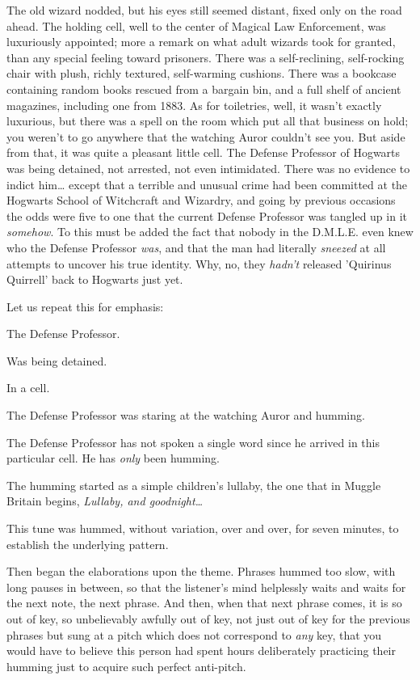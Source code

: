 The old wizard nodded, but his eyes still seemed distant, fixed only on the 
road ahead.
\sbreak
The holding cell, well to the center of Magical Law Enforcement, was 
luxuriously appointed; more a remark on what adult wizards took for granted, 
than any special feeling toward prisoners. There was a self-reclining, 
self-rocking chair with plush, richly textured, self-warming cushions. There 
was a bookcase containing random books rescued from a bargain bin, and a full 
shelf of ancient magazines, including one from 1883. As for toiletries, well, 
it wasn't exactly luxurious, but there was a spell on the room which put all 
that business on hold; you weren't to go anywhere that the watching Auror 
couldn't see you. But aside from that, it was quite a pleasant little cell. The 
Defense Professor of Hogwarts was being detained, not arrested, not even 
intimidated. There was no evidence to indict him{\ldots} except that a terrible 
and unusual crime had been committed at the Hogwarts School of Witchcraft and 
Wizardry, and going by previous occasions the odds were five to one that the 
current Defense Professor was tangled up in it \emph{somehow}. To this must be 
added the fact that nobody in the D.M.L.E. even knew who the Defense Professor 
\emph{was}, and that the man had literally \emph{sneezed} at all attempts to 
uncover his true identity. Why, no, they \emph{hadn't} released 'Quirinus 
Quirrell' back to Hogwarts just yet.

Let us repeat this for emphasis:

The Defense Professor.

Was being detained.

In a cell.

The Defense Professor was staring at the watching Auror and humming.

The Defense Professor has not spoken a single word since he arrived in this 
particular cell. He has \emph{only} been humming.

The humming started as a simple children's lullaby, the one that in Muggle 
Britain begins, \emph{Lullaby, and goodnight{\ldots}}

This tune was hummed, without variation, over and over, for seven minutes, to 
establish the underlying pattern.

Then began the elaborations upon the theme. Phrases hummed too slow, with long 
pauses in between, so that the listener's mind helplessly waits and waits for 
the next note, the next phrase. And then, when that next phrase comes, it is so 
out of key, so unbelievably awfully out of key, not just out of key for the 
previous phrases but sung at a pitch which does not correspond to \emph{any} 
key, that you would have to believe this person had spent hours deliberately 
practicing their humming just to acquire such perfect anti-pitch.

